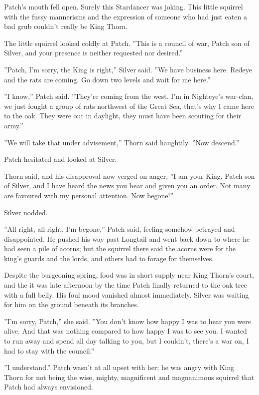 \documentclass[11pt]{article}
\begin{document}
 Patch's mouth fell open. Surely this Stardancer was joking. This little squirrel with the fussy mannerisms and the expression of someone who had just eaten a bad grub couldn't really be King Thorn.\par
 The little squirrel looked coldly at Patch. ''This is a council of war, Patch son of Silver, and your presence is neither requested nor desired.''\par
 ''Patch, I'm sorry, the King is right,'' Silver said. ''We have business here. Redeye and the rats are coming. Go down two levels and wait for me here.''\par
 ''I know,'' Patch said. ''They're coming from the west. I'm in Nighteye's war-clan, we just fought a group of rats northwest of the Great Sea, that's why I came here to the oak. They were out in daylight, they must have been scouting for their army.''\par
 ''We will take that under advisement,'' Thorn said haughtily. ''Now descend.''\par
 Patch hesitated and looked at Silver.\par
 Thorn said, and his disapproval now verged on anger, ''I am your King, Patch son of Silver, and I have heard the news you bear and given you an order. Not many are favoured with my personal attention. Now begone!''\par
 Silver nodded.\par
 ''All right, all right, I'm begone,'' Patch said, feeling somehow betrayed and disappointed. He pushed his way past Longtail and went back down to where he had seen a pile of acorns; but the squirrel there said the acorns were for the king's guards and the lords, and others had to forage for themselves.\par
 Despite the burgeoning spring, food was in short supply near King Thorn's court, and the it was late afternoon by the time Patch finally returned to the oak tree with a full belly. His foul mood vanished almost immediately. Silver was waiting for him on the ground beneath its branches.\par
 ''I'm sorry, Patch,'' she said. ''You don't know how happy I was to hear you were alive. And that was nothing compared to how happy I was to see you. I wanted to run away and spend all day talking to you, but I couldn't, there's a war on, I had to stay with the council.''\par
 ''I understand.'' Patch wasn't at all upset with her; he was angry with King Thorn for not being the wise, mighty, magnificent and magnanimous squirrel that Patch had always envisioned.\par
\end{document}
